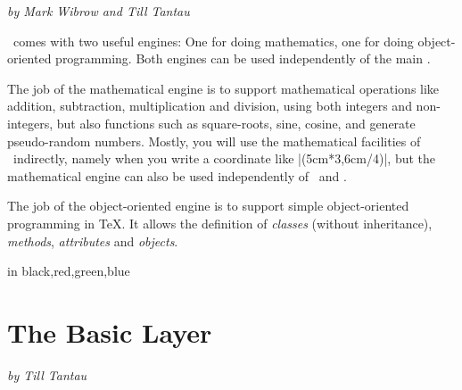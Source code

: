 {\Large \emph{by Mark Wibrow and Till Tantau}}


\bigskip
\noindent
\pgfname\ comes with two useful engines: One for doing mathematics, one for
doing object-oriented programming. Both engines can be used independently of
the main \pgfname.

The job of the mathematical engine is to support mathematical operations like
addition, subtraction, multiplication and division, using both integers and
non-integers, but also functions such as square-roots, sine, cosine, and
generate pseudo-random numbers. Mostly, you will use the mathematical
facilities of \pgfname\ indirectly, namely when you write a coordinate like
|(5cm*3,6cm/4)|, but the mathematical engine can also be used independently of
\pgfname\ and \tikzname.

The job of the object-oriented engine is to support simple object-oriented
programming in \TeX. It allows the definition of \emph{classes} (without
inheritance), \emph{methods}, \emph{attributes} and \emph{objects}.

\vskip1cm
\begin{codeexample}[graphic=white]
\foreach \col in {black,red,green,blue}
{
}
\end{codeexample}











\part[base]{The Basic Layer}

{\Large \emph{by Till Tantau}}


